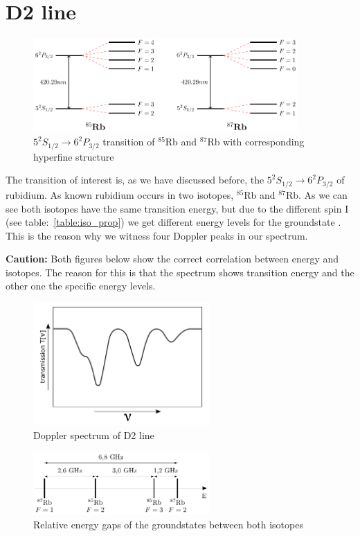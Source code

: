 \section{D2 line} %

\begin{figure}[h]
\centering
\includegraphics[width=0.9\textwidth]{energylevel}
\caption{\(5^{2}S_{1/2} \rightarrow 6^{2}P_{3/2}\) transition of \(^{85}\)Rb and \(^{87}\)Rb with corresponding hyperfine structure}    
\end{figure}

\vspace{\fill}

The transition of interest is, as we have discussed before, the \(5^{2}S_{1/2} \rightarrow 6^{2}P_{3/2}\) of rubidium. As known rubidium
occurs in two isotopes, \(^{85}\)Rb and \(^{87}\)Rb.
As we can see both isotopes have the same transition energy, but due to the different spin I (see table:~\ref{table:iso_prop}) we get
different energy levels for the groundstate \citep{nist_asd}. This is the reason why we witness four Doppler peaks in our spectrum.
\bigskip

\textbf{Caution:} Both figures below show the correct correlation between energy and isotopes. The reason for this is that the spectrum
shows transition energy and the other one the specific energy levels.

\vspace{\fill}

\begin{figure}[h]
\centering
\includegraphics[width=0.6\textwidth]{spectrum_doppler}
\caption{\label{fig:doppler}Doppler spectrum of D2 line} 
\end{figure}

\vspace{\fill}

\begin{figure}[ht]
\centering
\includegraphics[width=0.6\textwidth]{groundstate}
\caption{\label{fig:gap}Relative energy gaps of the groundstates between both isotopes} 
\end{figure}